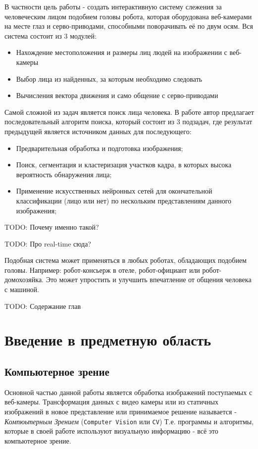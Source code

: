 \documentclass[12pt]{report}
\newenvironment{myItemize}{
	\begin{itemize}
  		\setlength{\itemsep}{1pt}
  		\setlength{\parskip}{0pt}
  		\setlength{\parsep}{0pt}
}{\end{itemize}}
\begin{document}
В частности цель работы - создать интерактивную систему слежения за человеческим лицом подобием головы робота, которая оборудована веб-камерами на месте глаз и серво-приводами, способными поворачивать её по двум осям. Вся система состоит из 3 модулей:
\begin{myItemize}
\item Нахождение местоположения и размеры лиц людей на изображении с веб-камеры
\item Выбор лица из найденных, за которым необходимо следовать
\item Вычисления вектора движения и само общение с серво-приводами
\end{myItemize}

Самой сложной из задач является поиск лица человека. В работе автор предлагает последовательный алгоритм поиска, который состоит из 3 подзадач, где результат предыдущей является источником данных для последующего:
\begin{myItemize}
\item Предварительная обработка и подготовка изображения;
\item Поиск, сегментация и кластеризация участков кадра, в которых высока вероятность обнаружения лица;
\item Применение искусственных нейронных сетей для окончательной классификации (лицо или нет) по нескольким представлениям данного изображения;
\end{myItemize}

TODO: Почему именно такой?

TODO: Про real-time сюда?

Подобная система может применяться в любых роботах, обладающих подобием головы.
Например: робот-консьерж в отеле, робот-официант или робот-домохозяйка. Это может упростить и улучшить
впечатление от общения человека с машиной.

TODO: Содержание глав

\chapter{Введение в предметную область}
\thispagestyle{fancy}

\section{Компьютерное зрение}

Основной частью данной работы является обработка изображений поступаемых с веб-камеры. Трансформация данных с видео камеры или из статичных изображений в новое представление или принимаемое решение называется - \emph{Компюьтерным Зрением} (\texttt{Computer Vision} или \texttt{CV})\citep{bradski2008learning} Т.е. программы и алгоритмы, которые в своей работе используют визуальную информацию - всё это компьютерное зрение.
\end{document}
